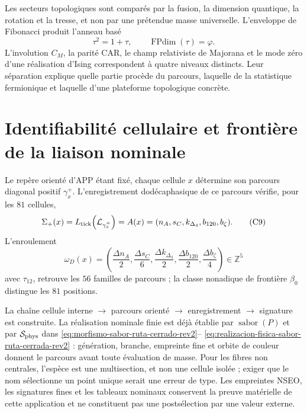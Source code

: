 Les secteurs topologiques sont comparés par la fusion, la dimension quantique, la rotation et
la tresse, et non par une prétendue masse universelle. L'enveloppe de Fibonacci produit
l'anneau basé
\[
\tau^2=1+\tau,
\qquad
\operatorname{FPdim}(\tau)=\varphi.
\tag{C8}\label{eq:fibonacci-catalogo-rev6}
\]
L'involution \(C_M\), la parité CAR, le champ relativiste de Majorana et le
mode zéro d'une réalisation d'Ising correspondent à quatre niveaux distincts. Leur
séparation explique quelle partie procède du parcours, laquelle de la statistique
fermionique et laquelle d'une plateforme topologique concrète.

\section{Identifiabilité cellulaire et frontière de la liaison nominale}
\label{sec:reconstruccion-interna-masas-rev6}

Le repère orienté d'APP étant fixé, chaque cellule \(x\) détermine son parcours diagonal
positif \(\gamma_x^+\). L'enregistrement dodécaphasique de ce parcours vérifie, pour
les \(81\) cellules,
\[
 \Sigma_+(x)
 =L_{\rm tick}\!\left(\mathcal L_{\gamma_x^+}\right)
 =A(x)
 =(n_A,s_C,k_{\Delta_4},b_{120},b_{\zeta}).
\tag{C9}\label{eq:extractor-reconstruccion-masa-rev6}
\]
L'enroulement
\[
 \omega_D(x)=
 \left(
 \frac{\Delta n_A}{2},
 \frac{\Delta s_C}{6},
 \frac{\Delta k_{\Delta_4}}{2},
 \frac{\Delta b_{120}}{2},
 \frac{\Delta b_{\zeta}}{4}
 \right)
 \in\mathbb Z^5
\tag{C10}\label{eq:devanado-reconstruccion-masa-rev8}
\]
avec \(\tau_{12}\), retrouve les \(56\) familles de parcours ; la classe
nonadique de frontière \(\beta_0\) distingue les \(81\) positions.

\begin{exactbox}[title={Portée exacte du résultat}]
La chaîne cellule interne \(\to\) parcours orienté
\(\to\) enregistrement \(\to\) signature est construite. La réalisation nominale finie est déjà
établie par \(\operatorname{sabor}(P)\) et par
\(\mathcal S_{\rm phys}\) dans
\eqref{eq:morfismo-sabor-ruta-cerrado-rev2}--
\eqref{eq:realizacion-fisica-sabor-ruta-cerrada-rev2} : génération, branche,
empreinte fine et orbite de couleur donnent le parcours avant toute évaluation de
masse. Pour les fibres non centrales, l'espèce est une multisection, et non une
cellule isolée ; exiger que le nom sélectionne un point unique serait une erreur
de type. Les empreintes NSEO, les signatures fines et les tableaux nominaux conservent
la preuve matérielle de cette application et ne constituent pas une postsélection par
une valeur externe.
\end{exactbox}

